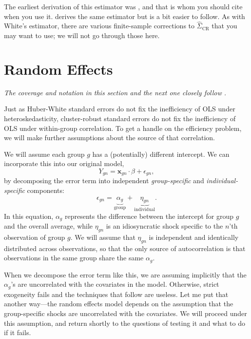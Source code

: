 \documentclass[12pt,oneside,openany]{book}
\begin{document}
The earliest derivation of this estimator was \citet{Liang:1986gv}, and
that is whom you should cite when you use it. \citet{Arellano:1987jx}
derives the same estimator but is a bit easier to follow. As with
White's estimator, there are various finite-sample corrections to
\(\hat{\Sigma}_{\text{CR}}\) that you may want to use; we will not go
through those here.

\section{Random Effects}\label{random-effects}

\emph{The coverage and notation in this section and the next one closely
follow \citet[chapter 12]{Johnston:1997um}.}

Just as Huber-White standard errors do not fix the inefficiency of OLS
under heteroskedasticity, cluster-robust standard errors do not fix the
inefficiency of OLS under within-group correlation. To get a handle on
the efficiency problem, we will make further assumptions about the
source of that correlation.

We will assume each group \(g\) has a (potentially) different intercept.
We can incorporate this into our original model, \[
Y_{gn} = \mathbf{x}_{gn} \cdot \beta + \epsilon_{gn},
\] by decomposing the error term into independent \emph{group-specific}
and \emph{individual-specific} components: \[
\epsilon_{gn} = \underbrace{\alpha_g}_{\text{group}} + \underbrace{\eta_{gn}}_{\text{individual}}.
\] In this equation, \(\alpha_g\) represents the difference between the
intercept for group \(g\) and the overall average, while \(\eta_{gn}\)
is an idiosyncratic shock specific to the \(n\)'th observation of group
\(g\). We will assume that \(\eta_{gn}\) is independent and identically
distributed across observations, so that the only source of
autocorrelation is that observations in the same group share the same
\(\alpha_g\).

When we decompose the error term like this, we are assuming implicitly
that the \(\alpha_g\)'s are uncorrelated with the covariates in the
model. Otherwise, strict exogeneity fails and the techniques that follow
are useless. Let me put that another way---the random effects model
depends on the assumption that the group-specific shocks are
uncorrelated with the covariates. We will proceed under this assumption,
and return shortly to the questions of testing it and what to do if it
fails.
\end{document}
